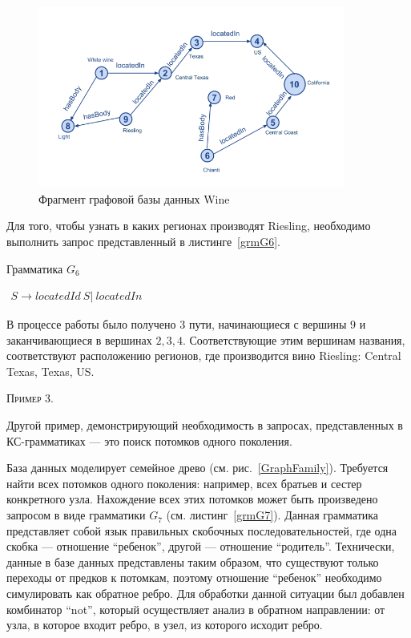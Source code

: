 \begin{figure}
 \centering
 \includegraphics[width=0.9\textwidth]{Smolina/pics/GraphWine.png}
 \caption{Фрагмент графовой базы данных Wine}
 \label{GraphWine}
\end{figure}

Для того, чтобы узнать в каких регионах производят Riesling, необходимо выполнить запрос представленный в листинге~\ref{grmG6}. 

\begin{listing}
\caption{Грамматика $G_6$}
\label{grmG6}
\centering
$\begin{array}{rl}
S \rightarrow locatedId \ S | \ locatedIn
\end{array}$
 \end{listing}

В процессе работы было получено 3 пути, начинающиеся с вершины $9$ и заканчивающиеся в вершинах $2, 3, 4$. Соответствующие этим вершинам названия, соответствуют расположению регионов, где производится вино Riesling: Central Texas, Texas, US.
 
 \textsc{Пример 3.}

Другой пример, демонстрирующий необходимость в запросах, представленных в КС-грамматиках --- это поиск потомков одного поколения.

База данных моделирует семейное древо (см. рис.~\ref{GraphFamily}). Требуется найти всех потомков одного поколения: например, всех братьев и сестер конкретного узла. Нахождение всех этих потомков может быть произведено запросом в виде грамматики $G_7$ (см. листинг~\ref{grmG7}). Данная грамматика представляет собой язык правильных скобочных последовательностей, где одна скобка --- отношение ``ребенок'', другой --- отношение ``родитель''. Технически, данные в базе данных представлены таким образом, что существуют только переходы от предков к потомкам, поэтому отношение ``ребенок'' необходимо симулировать как обратное ребро. Для обработки данной ситуации был добавлен комбинатор ``not'', который осуществляет анализ в обратном направлении: от узла, в которое входит ребро, в узел, из которого исходит ребро.

